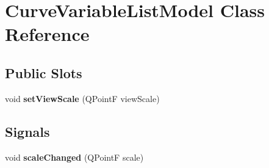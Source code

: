\hypertarget{class_curve_variable_list_model}{
\section{\-Curve\-Variable\-List\-Model \-Class \-Reference}
\label{class_curve_variable_list_model}
}
\subsection*{\-Public \-Slots}
\begin{DoxyCompactItemize}
\item 
\hypertarget{class_curve_variable_list_model_a41e5337a2b42f1b4083cc4e602baeb39}{
void {\bfseries set\-View\-Scale} (\-Q\-Point\-F view\-Scale)}
\label{class_curve_variable_list_model_a41e5337a2b42f1b4083cc4e602baeb39}

\end{DoxyCompactItemize}
\subsection*{\-Signals}
\begin{DoxyCompactItemize}
\item 
\hypertarget{class_curve_variable_list_model_aae77de19220ba0a6658ad4c17e993ac1}{
void {\bfseries scale\-Changed} (\-Q\-Point\-F scale)}
\label{class_curve_variable_list_model_aae77de19220ba0a6658ad4c17e993ac1}

\end{DoxyCompactItemize}

